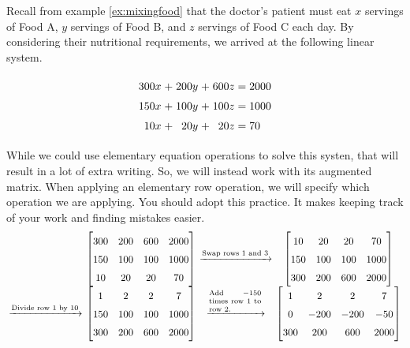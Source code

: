\begin{example}\label{ex:nutrisolve}
	Recall from example \ref{ex:mixingfood} that the doctor's patient must eat $x$ servings of Food A, $y$ servings of Food B, and $z$ servings of Food C each day. By considering their nutritional requirements, we arrived at the following linear system.

	\[
	\arraycolsep=1.4pt
	\begin{array}{rcrcrl}
		300x &+& 200y &+& 600z &= 2000\\
		150x &+& 100y &+& 100z &= 1000\\
		10x &+& 20y &+& 20z&= 70
	\end{array}
	\]

	While we could use elementary equation operations to solve this systen, that will result in a lot of extra writing. So, we will instead work with its augmented matrix. When applying an elementary row operation, we will specify which operation we are applying. You should adopt this practice. It makes keeping track of your work and finding mistakes easier.
	\[
		\setlength{\tabcolsep}{2pt}
		\renewcommand{\arraystretch}{1.5}
		\begin{tabular}{rccc}
			&$\begin{bmatrix}
				300 & 200 & 600 & 2000\\
				150 & 100 & 100 & 1000\\
				10 & 20 & 20 & 70
			\end{bmatrix}$
			&$\xrightarrow{\text{\scriptsize Swap rows 1 and 3}}$
			&
			$\begin{bmatrix}
				10 & 20 & 20 & 70\\
				150 & 100 & 100 & 1000\\
				300 & 200 & 600 & 2000
			\end{bmatrix}$
			\\
			$\xrightarrow{\text{\scriptsize Divide row 1 by 10}}$
			&
			$\begin{bmatrix}
				1 & 2 & 2 & 7\\
				150 & 100 & 100 & 1000\\
				300 & 200 & 600 & 2000
			\end{bmatrix}$
			&
			$\xrightarrow{\begin{minipage}{0.15\textwidth} \scriptsize Add $-150$ times row 1 to row 2.
			\end{minipage}}$
			&
			$\begin{bmatrix}
				1 & 2 & 2 & 7\\
				0 & -200 & -200 & -50\\
				300 & 200 & 600 & 2000
			\end{bmatrix}$
		\end{tabular}
	\]


\end{example}

